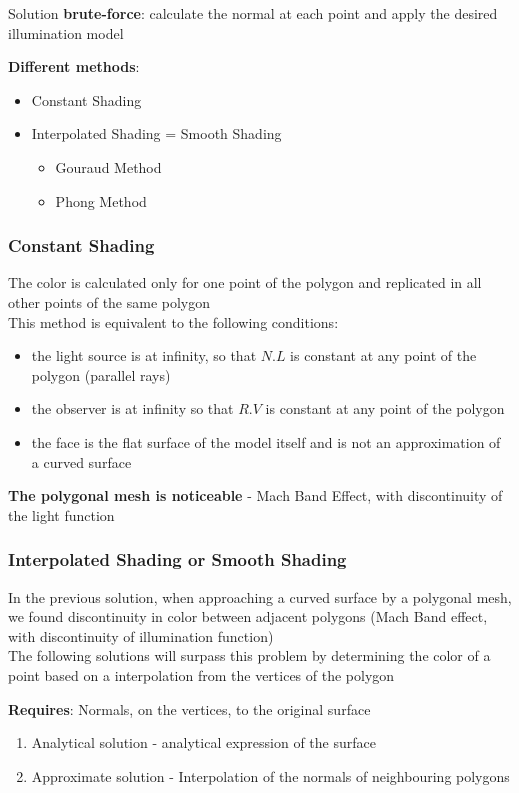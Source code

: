 \documentclass[a4paper]{article}
\begin{document}
\begin{flushleft}
Solution \textbf{brute-force}: calculate the normal at each point and apply the desired illumination model

\textbf{Different methods}:
\begin{itemize}
	\item Constant Shading
	\item Interpolated Shading = Smooth Shading
	\begin{itemize}
		\item Gouraud Method
		\item Phong Method
	\end{itemize}
\end{itemize}

\subsubsection{Constant Shading}
The color is calculated only for one point of the polygon and replicated in all other points of the same polygon\\
This method is equivalent to the following conditions:
\begin{itemize}
	\item the light source is at infinity, so that $N.L$ is constant at any point of the polygon (parallel rays)
	\item the observer is at infinity so that $R.V$ is constant at any point of the polygon
	\item the face is the flat surface of the model itself and is not an approximation of a curved surface
\end{itemize}

\textbf{The polygonal mesh is noticeable} - Mach Band Effect, with discontinuity of the light function

\subsubsection{Interpolated Shading or Smooth Shading}
In the previous solution, when approaching a curved surface by a polygonal mesh, we found discontinuity in color between adjacent polygons (Mach Band effect, with discontinuity of illumination function)\\
The following solutions will surpass this problem by determining the color of a point based on a interpolation from the vertices of the polygon

\textbf{Requires}: Normals, on the vertices, to the original surface
\begin{enumerate}
	\item Analytical solution - analytical expression of the surface
	\item Approximate solution - Interpolation of the normals of neighbouring polygons
\end{enumerate}


\end{flushleft}
\end{document}
